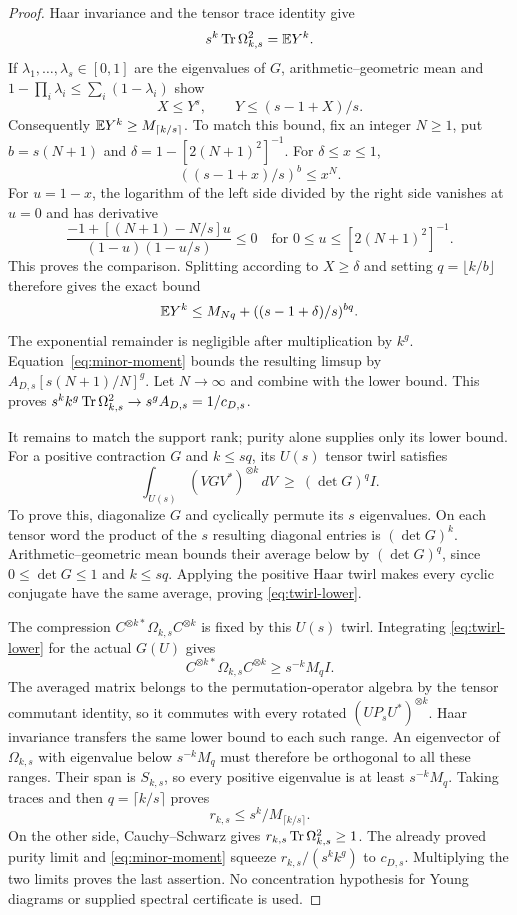 \begin{proof}
Haar invariance and the tensor trace identity give
\begin{equation}\label{eq:two-moments}
 s^k\operatorname{Tr}\Omega_{k,s}^2=\mathbb E Y^k.
\end{equation}
If $\lambda_1,\ldots,\lambda_s\in[0,1]$ are the eigenvalues of $G$, arithmetic--geometric mean and $1-\prod_i\lambda_i\le\sum_i(1-\lambda_i)$ show
\[
 X\le Y^s,\qquad Y\le(s-1+X)/s.
\]
Consequently $\mathbb E Y^k\ge M_{\lceil k/s\rceil}$. To match this bound, fix an integer $N\ge1$, put $b=s(N+1)$ and $\delta=1-[2(N+1)^2]^{-1}$. For $\delta\le x\le1$,
\[
 ((s-1+x)/s)^b\le x^N.
\]
For $u=1-x$, the logarithm of the left side divided by the right side vanishes at $u=0$ and has derivative
\[
 \frac{-1+[(N+1)-N/s]u}{(1-u)(1-u/s)}\le0
 \quad\text{for }0\le u\le[2(N+1)^2]^{-1}.
\]
This proves the comparison. Splitting according to $X\ge\delta$ and setting $q=\lfloor k/b\rfloor$ therefore gives the exact bound
\[
 \mathbb E Y^k\le M_{Nq}+((s-1+\delta)/s)^{bq}.
\]
The exponential remainder is negligible after multiplication by $k^g$. Equation~\eqref{eq:minor-moment} bounds the resulting limsup by $A_{D,s}[s(N+1)/N]^g$. Let $N\to\infty$ and combine with the lower bound. This proves $s^kk^g\operatorname{Tr}\Omega_{k,s}^2\to s^gA_{D,s}=1/c_{D,s}$.

It remains to match the support rank; purity alone supplies only its lower bound. For a positive contraction $G$ and $k\le sq$, its $U(s)$ tensor twirl satisfies
\begin{equation}\label{eq:twirl-lower}
 \int_{U(s)}(VGV^*)^{\otimes k}\,dV\ \ge\ (\det G)^q I.
\end{equation}
To prove this, diagonalize $G$ and cyclically permute its $s$ eigenvalues. On each tensor word the product of the $s$ resulting diagonal entries is $(\det G)^k$. Arithmetic--geometric mean bounds their average below by $(\det G)^q$, since $0\le\det G\le1$ and $k\le sq$. Applying the positive Haar twirl makes every cyclic conjugate have the same average, proving \eqref{eq:twirl-lower}.

The compression $C^{\otimes k*}\Omega_{k,s}C^{\otimes k}$ is fixed by this $U(s)$ twirl. Integrating \eqref{eq:twirl-lower} for the actual $G(U)$ gives
\[
 C^{\otimes k*}\Omega_{k,s}C^{\otimes k}\ge s^{-k}M_q I.
\]
The averaged matrix belongs to the permutation-operator algebra by the tensor commutant identity, so it commutes with every rotated $(UP_sU^*)^{\otimes k}$. Haar invariance transfers the same lower bound to each such range. An eigenvector of $\Omega_{k,s}$ with eigenvalue below $s^{-k}M_q$ must therefore be orthogonal to all these ranges. Their span is $S_{k,s}$, so every positive eigenvalue is at least $s^{-k}M_q$. Taking traces and then $q=\lceil k/s\rceil$ proves
\[
 r_{k,s}\le s^k/M_{\lceil k/s\rceil}.
\]
On the other side, Cauchy--Schwarz gives $r_{k,s}\operatorname{Tr}\Omega_{k,s}^2\ge1$. The already proved purity limit and \eqref{eq:minor-moment} squeeze $r_{k,s}/(s^kk^g)$ to $c_{D,s}$. Multiplying the two limits proves the last assertion. No concentration hypothesis for Young diagrams or supplied spectral certificate is used.
\end{proof}


